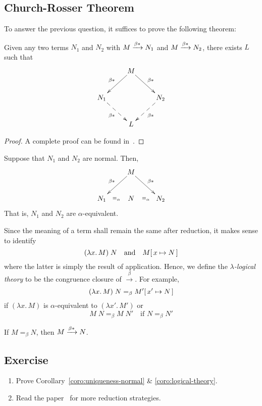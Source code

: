\subsection{Church-Rosser Theorem}
To answer the previous question, it suffices to prove the following theorem:
\begin{theorem}
  Given any two terms $N_1$ and $N_2$ with $M \xrightarrow{\beta*} N_1$ and $M\xrightarrow{\beta*} N_2$,
  there exists $L$ such that
  \[
    \xymatrix{
      & M \ar[rd]^{\beta*} \ar[ld]_{\beta*} \\
      N_1 \ar@{-->}[rd]_{\beta*} & & N_2 \ar@{-->}[ld]^{\beta*} \\
      & L
    }
  \]
\end{theorem}
\begin{proof}
  A complete proof can be found in~\cite[Chapter 4]{Barendregt1984}.
\end{proof}
\begin{corollary}\label{coro:uniqueness-normal}
  Suppose that $N_1$ and $N_2$ are normal. Then, 
  \[
    \xymatrix{
      & M \ar[rd]^{\beta*} \ar[ld]_{\beta*} \\
      N_1 \ar@{}[r]|{\equiv_\alpha} & N & N_2 \ar@{}[l]|{\equiv_\alpha} \\
    }
  \]
  That is, $N_1$ and $N_2$ are $\alpha$-equivalent.
\end{corollary}

Since the meaning of a term shall remain the same after reduction, it makes
sense to identify 
\[
  (\lambda x.\, M)\;N
  \quad\text{and}\quad
  M[\,x\mapsto N\,]
\]
where the latter is simply the result of application. Hence, we define the
\emph{$\lambda$-logical theory} to be the congruence closure of
$\xrightarrow{\beta}$. For example, 
\[
  (\lambda x.\, M)\;N
  =_\beta
  M'[\,x'\mapsto N\,]
\]
if $(\lambda x.\, M)$ is $\alpha$-equivalent to $(\lambda x'.\,M')$ or
\[
  M\;N =_\beta M\;N'
  \quad\text{if } N =_\beta N'
\]
\begin{corollary} \label{coro:logical-theory}
  If $M =_\beta N$, then $M \xrightarrow{\beta*} N$.
\end{corollary}
\subsection*{Exercise}
\begin{enumerate}
  \item Prove
    Corollary~\ref{coro:uniqueness-normal} \& \ref{coro:logical-theory}.
  \item Read the paper~\cite[Section 7]{Sestoft2002} for more reduction
    strategies.
\end{enumerate}
